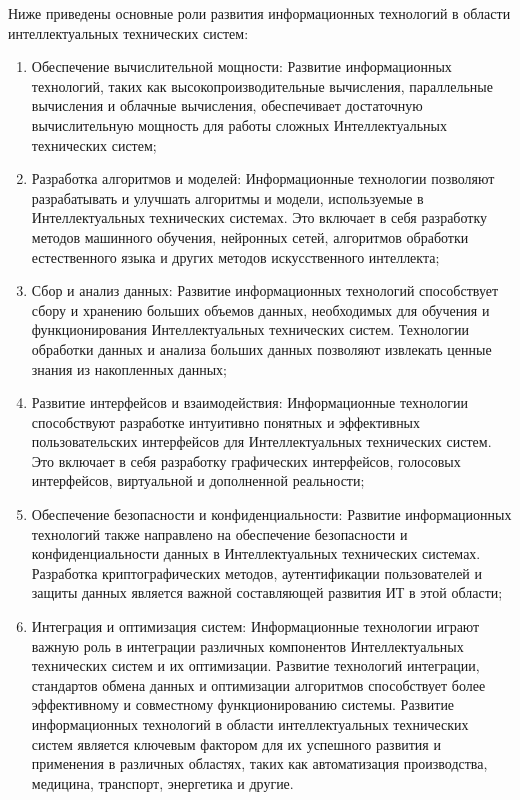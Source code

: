     Ниже приведены основные роли развития информационных технологий в области интеллектуальных технических систем:
    \begin{enumerate}
        \item Обеспечение вычислительной мощности: Развитие информационных технологий, таких как высокопроизводительные вычисления, параллельные вычисления и облачные вычисления, обеспечивает достаточную вычислительную мощность для работы сложных Интеллектуальных технических систем;
        \item Разработка алгоритмов и моделей: Информационные технологии позволяют разрабатывать и улучшать алгоритмы и модели, используемые в Интеллектуальных технических системах. Это включает в себя разработку методов машинного обучения, нейронных сетей, алгоритмов обработки естественного языка и других методов искусственного интеллекта;
        \item Сбор и анализ данных: Развитие информационных технологий способствует сбору и хранению больших объемов данных, необходимых для обучения и функционирования Интеллектуальных технических систем. Технологии обработки данных и анализа больших данных позволяют извлекать ценные знания из накопленных данных;
        \item Развитие интерфейсов и взаимодействия: Информационные технологии способствуют разработке интуитивно понятных и эффективных пользовательских интерфейсов для Интеллектуальных технических систем. Это включает в себя разработку графических интерфейсов, голосовых интерфейсов, виртуальной и дополненной реальности;
        \item Обеспечение безопасности и конфиденциальности: Развитие информационных технологий также направлено на обеспечение безопасности и конфиденциальности данных в Интеллектуальных технических системах. Разработка криптографических методов, аутентификации пользователей и защиты данных является важной составляющей развития ИТ в этой области;
        \item Интеграция и оптимизация систем: Информационные технологии играют важную роль в интеграции различных компонентов Интеллектуальных технических систем и их оптимизации. Развитие технологий интеграции, стандартов обмена данных и оптимизации алгоритмов способствует более эффективному и совместному функционированию системы.
        Развитие информационных технологий в области интеллектуальных технических систем является ключевым фактором для их успешного развития и применения в различных областях, таких как автоматизация производства, медицина, транспорт, энергетика и другие.

\end{enumerate}
